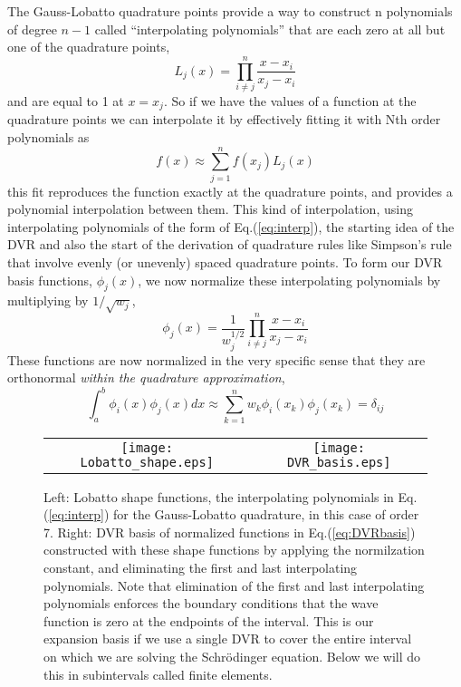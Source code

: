 \documentclass[aps,amssymb,superscriptaddress,floatfix]{revtex4}
\begin{document}
The Gauss-Lobatto quadrature points provide a way to construct n polynomials of degree $n-1$ called ``interpolating polynomials'' that are each zero at all but one of the quadrature points,
\begin{equation}
L_j(x) = \prod_{i \ne j}^n \frac{x-x_i}{x_j-x_i}
\label{eq:interp}
\end{equation}
and are equal to 1 at $x=x_j$. So if we have the values of a function at the quadrature points we can interpolate it by effectively fitting it with Nth order polynomials as
\begin{equation}
f(x) \approx \sum_{j=1}^n f(x_j) L_j(x) 
\end{equation}
this fit reproduces the function exactly at the quadrature points, and provides a polynomial interpolation between them.  This kind of interpolation, using interpolating polynomials of the form of Eq.(\ref{eq:interp}),  the starting idea of the DVR and also the start of the derivation of quadrature rules like Simpson's rule that involve evenly (or unevenly) spaced quadrature points.   To form our DVR basis functions, $\phi_j(x)$, we now normalize these interpolating polynomials by multiplying by $1/\sqrt{w_j}$,
\begin{equation}
\phi_j(x) = \frac{1}{w_j^{1/2}}  \prod_{i \ne j}^n \frac{x-x_i}{x_j-x_i}  
\label{eq:DVRbasis}
\end{equation}
These functions are now normalized in the very specific sense that they are orthonormal \textit{within the quadrature approximation},
\begin{equation}
\int_a^b \phi_i(x) \phi_j(x) dx \approx  \sum_{k=1}^n w_k \phi_i(x_k) \phi_j(x_k) = \delta_{ij}
\end{equation}
\begin{figure}[h]
\begin{center}
\begin{tabular}{cc}
\texttt{[image: Lobatto\_shape.eps]}&
\texttt{[image: DVR\_basis.eps]}
\end{tabular}
\caption{Left: Lobatto shape functions, the interpolating polynomials in Eq.(\ref{eq:interp}) for the Gauss-Lobatto quadrature, in this case of order 7.  Right: DVR basis of normalized functions in Eq.(\ref{eq:DVRbasis}) constructed with these shape functions by applying the normilzation constant, and eliminating the first and last interpolating polynomials.  Note that elimination of the first and last interpolating polynomials enforces the boundary conditions that the wave function is zero at the endpoints of the interval.  This is our expansion basis if we use a single DVR to cover the entire interval on which we are solving the Schr\"odinger equation.  Below we will do this in subintervals called finite elements. }
\label{fig:DVRbasis}
\end{center}
\end{figure}
\end{document}

